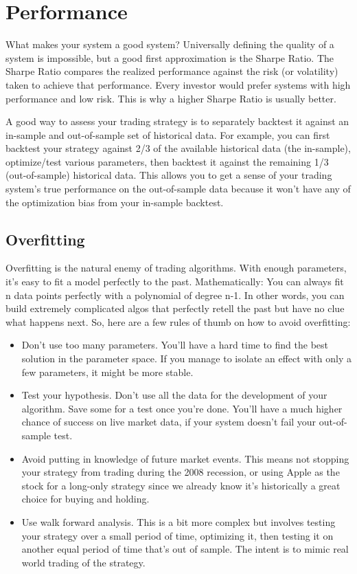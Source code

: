 \documentclass[letterpaper,10pt,english]{sphinxmanual}
\begin{document}
\chapter{Performance}
\label{performance:performance}\label{performance::doc}
What makes your system a good system? Universally defining the quality of a system is impossible, but a good first approximation is the Sharpe Ratio. The Sharpe Ratio compares the realized performance against the risk (or volatility) taken to achieve that performance. Every investor would prefer systems with high performance and low risk. This is why a higher Sharpe Ratio is usually better.

A good way to assess your trading strategy is to separately backtest it against an in-sample and out-of-sample set of historical data. For example, you can first backtest your strategy against 2/3 of the available historical data (the in-sample), optimize/test various parameters, then backtest it against the remaining 1/3 (out-of-sample) historical data. This allows you to get a sense of your trading system's true performance on the out-of-sample data because it won't have any of the optimization bias from your in-sample backtest.


\section{Overfitting}
\label{performance:overfitting}
Overfitting is the natural enemy of trading algorithms. With enough parameters, it’s easy to fit a model perfectly to the past. Mathematically: You can always fit n data points perfectly with a polynomial of degree n-1. In other words, you can build extremely complicated algos that perfectly retell the past but have no clue what happens next. So, here are a few rules of thumb on how to avoid overfitting:
\begin{itemize}
\item {} 
Don’t use too many parameters. You’ll have a hard time to find the best solution in the parameter space. If you manage to isolate an effect with only a few parameters, it might be more stable.

\item {} 
Test your hypothesis. Don’t use all the data for the development of your algorithm. Save some for a test once you’re done. You’ll have a much higher chance of success on live market data, if your system doesn’t fail your out-of-sample test.

\item {} 
Avoid putting in knowledge of future market events. This means not stopping your strategy from trading during the 2008 recession, or using Apple as the stock for a long-only strategy since we already know it’s historically a great choice for buying and holding.

\item {} 
Use walk forward analysis. This is a bit more complex but involves testing your strategy over a small period of time, optimizing it, then testing it on another equal period of time that’s out of sample. The intent is to mimic real world trading of the strategy.

\end{itemize}
\end{document}
